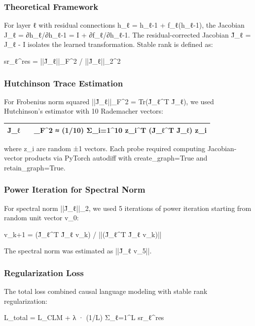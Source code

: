 
\subsubsection{Theoretical Framework}

For layer ℓ with residual connections h_ℓ = h_{ℓ-1} + f_ℓ(h_{ℓ-1}), the Jacobian J_ℓ = ∂h_ℓ/∂h_{ℓ-1} = I + ∂f_ℓ/∂h_{ℓ-1}. The residual-corrected Jacobian J̃_ℓ = J_ℓ - I isolates the learned transformation. Stable rank is defined as:

sr_ℓ^res = ||J̃_ℓ||_F^2 / ||J̃_ℓ||_2^2

\subsubsection{Hutchinson Trace Estimation}

For Frobenius norm squared ||J̃_ℓ||_F^2 = Tr(J̃_ℓ^T J̃_ℓ), we used Hutchinson's estimator with 10 Rademacher vectors:

\begin{table}[htbp]
\centering
\begin{tabular}{lll}
\toprule
J̃_ℓ &  & _F^2 ≈ (1/10) Σ_{i=1}^{10} z_i^T (J̃_ℓ^T J̃_ℓ) z_i \\
\midrule
\bottomrule
\end{tabular}
\end{table}

where z_i are random ±1 vectors. Each probe required computing Jacobian-vector products via PyTorch autodiff with create_graph=True and retain_graph=True.

\subsubsection{Power Iteration for Spectral Norm}

For spectral norm ||J̃_ℓ||_2, we used 5 iterations of power iteration starting from random unit vector v_0:

v_{k+1} = (J̃_ℓ^T J̃_ℓ v_k) / ||(J̃_ℓ^T J̃_ℓ v_k)||

The spectral norm was estimated as ||J̃_ℓ v_5||.

\subsubsection{Regularization Loss}

The total loss combined causal language modeling with stable rank regularization:

L_total = L_CLM + λ · (1/L) Σ_{ℓ=1}^{L} sr_ℓ^res

